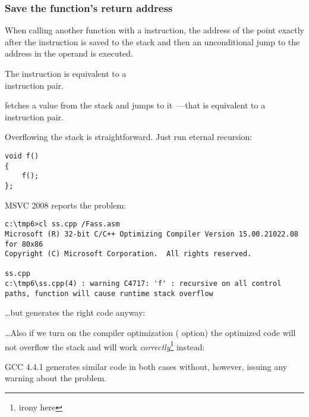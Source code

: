\subsubsection{Save the function's return address}


When calling another function with a \CALL instruction, the address of the point exactly after the \CALL instruction is saved 
to the stack and then an unconditional jump to the address in the \CALL operand is executed.

The \CALL instruction is equivalent to a\\
 instruction pair.

\RET fetches a value from the stack and jumps to it~---that is equivalent to a  instruction pair.

\myindex{\Stack!\MLStackOverflow}
\myindex{\Recursion}
Overflowing the stack is straightforward. Just run eternal recursion:

\begin{lstlisting}[style=customc]
void f()
{
	f();
};
\end{lstlisting}

MSVC 2008 reports the problem:

\begin{lstlisting}
c:\tmp6>cl ss.cpp /Fass.asm
Microsoft (R) 32-bit C/C++ Optimizing Compiler Version 15.00.21022.08 for 80x86
Copyright (C) Microsoft Corporation.  All rights reserved.

ss.cpp
c:\tmp6\ss.cpp(4) : warning C4717: 'f' : recursive on all control paths, function will cause runtime stack overflow
\end{lstlisting}

\dots but generates the right code anyway:



\dots Also if we turn on the compiler optimization (\TT{\Ox} option) the optimized code will not overflow the stack 
and will work \emph{correctly}\footnote{irony here} instead:



GCC 4.4.1 generates similar code in both cases without, however,  issuing any warning about the problem.

